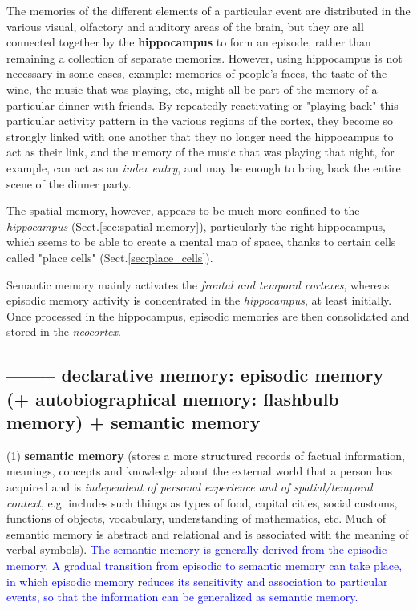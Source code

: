   The memories of the different elements of a particular event are distributed
  in the various visual, olfactory and auditory areas of the brain, but they are
  all connected together by the {\bf hippocampus} to form an episode, rather
  than remaining a collection of separate memories. However, using hippocampus
  is not necessary in some cases, example:
  memories of people's faces, the taste of the wine, the music that
  was playing, etc, might all be part of the memory of a particular dinner with
  friends. By repeatedly reactivating or "playing back" this particular activity
  pattern in the various regions of the cortex, they become so strongly linked
  with one another that they no longer need the hippocampus to act as their
  link, and the memory of the music that was playing that night, for example,
  can act as an {\it index entry}, and may be enough to bring back the entire
  scene of the dinner party.
  
  The spatial memory, however, appears to be much more confined to the {\it
  hippocampus} (Sect.\ref{sec:spatial-memory}), particularly the right
  hippocampus, which seems to be able to create a mental map of space, thanks to
  certain cells called "place cells" (Sect.\ref{sec:place_cells}).
  
  
  Semantic memory mainly activates the {\it frontal and temporal cortexes},
  whereas episodic memory activity is concentrated in the {\it hippocampus}, at
  least initially. Once processed in the hippocampus, episodic memories are then
  consolidated and stored in the {\it neocortex}.
  
\subsection{-------- declarative memory: episodic memory (+ autobiographical
memory: flashbulb memory) + semantic memory}
\label{sec:episodic-memory}
\label{sec:semantic-memory}
\label{sec:autobiographical-memory}

(1) {\bf semantic memory} (stores a more structured records of factual
information, meanings, concepts and knowledge about the external world that a
person has acquired and is {\it independent of personal experience and of
spatial/temporal context}, e.g.
includes such things as types of food, capital cities, social customs, functions
of objects, vocabulary, understanding of mathematics, etc. Much of semantic
memory is abstract and relational and is associated with the meaning of verbal
symbols). \textcolor{blue}{The semantic memory is generally derived from the
episodic memory. A gradual transition from episodic to semantic memory can take
place, in which episodic memory reduces its sensitivity and association to
particular events, so that the information can be generalized as semantic
memory.}


